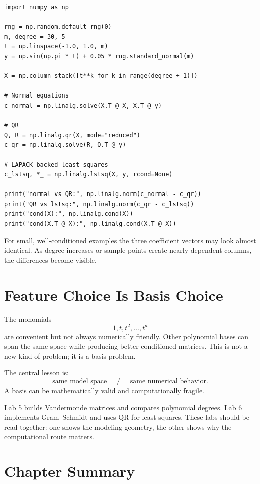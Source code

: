 \begin{lstlisting}
import numpy as np

rng = np.random.default_rng(0)
m, degree = 30, 5
t = np.linspace(-1.0, 1.0, m)
y = np.sin(np.pi * t) + 0.05 * rng.standard_normal(m)

X = np.column_stack([t**k for k in range(degree + 1)])

# Normal equations
c_normal = np.linalg.solve(X.T @ X, X.T @ y)

# QR
Q, R = np.linalg.qr(X, mode="reduced")
c_qr = np.linalg.solve(R, Q.T @ y)

# LAPACK-backed least squares
c_lstsq, *_ = np.linalg.lstsq(X, y, rcond=None)

print("normal vs QR:", np.linalg.norm(c_normal - c_qr))
print("QR vs lstsq:", np.linalg.norm(c_qr - c_lstsq))
print("cond(X):", np.linalg.cond(X))
print("cond(X.T @ X):", np.linalg.cond(X.T @ X))
\end{lstlisting}

For small, well-conditioned examples the three coefficient vectors may look
almost identical. As degree increases or sample points create nearly dependent
columns, the differences become visible.

\section{Feature Choice Is Basis Choice}

The monomials
\[
  1,t,t^2,\ldots,t^d
\]
are convenient but not always numerically friendly. Other polynomial bases can
span the same space while producing better-conditioned matrices. This is not a
new kind of problem; it is a basis problem.

The central lesson is:
\[
  \text{same model space} \quad \neq \quad \text{same numerical behavior}.
\]
A basis can be mathematically valid and computationally fragile.

\begin{labbox}
Lab 5 builds Vandermonde matrices and compares polynomial degrees. Lab 6
implements Gram--Schmidt and uses QR for least squares. These labs should be
read together: one shows the modeling geometry, the other shows why the
computational route matters.
\end{labbox}

\section*{Chapter Summary}

